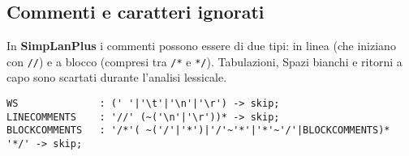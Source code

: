 \documentclass[../../main]{subfiles}
\begin{document}
\subsection{Commenti e caratteri ignorati}
In \textbf{SimpLanPlus} i commenti possono essere di due tipi: 
in linea (che iniziano con \verb|//|) e a blocco (compresi tra \verb|/*| e \verb|*/|). Tabulazioni, Spazi bianchi 
e ritorni a capo sono scartati durante l'analisi lessicale.
\begin{lstlisting}[style=antlr]
WS              : (' '|'\t'|'\n'|'\r') -> skip;
LINECOMMENTS    : '//' (~('\n'|'\r'))* -> skip;
BLOCKCOMMENTS   : '/*'( ~('/'|'*')|'/'~'*'|'*'~'/'|BLOCKCOMMENTS)* '*/' -> skip;
\end{lstlisting}
\end{document}
